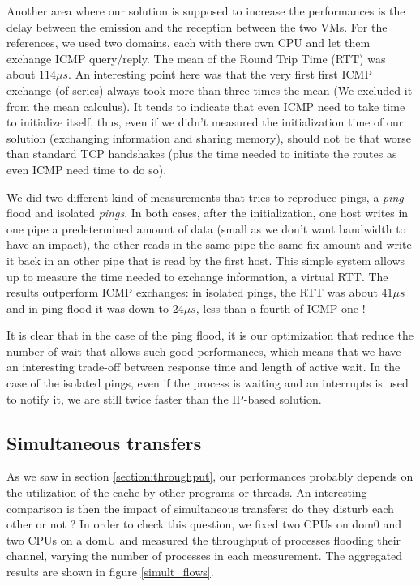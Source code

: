 \documentclass[journal]{IEEEtran}
\begin{document}
Another area where our solution is supposed to increase the performances is the delay between the emission and the reception between the two VMs. For the references, we used two domains, each with there own CPU and let them exchange ICMP query/reply. The mean of the Round Trip Time (RTT) was about $114 \mu s$. An interesting point here was that the very first first ICMP exchange (of series) always took more than three times the mean (We excluded it from the mean calculus). It tends to indicate that even ICMP need to take time to initialize itself, thus, even if we didn't measured the initialization time of our solution (exchanging information and sharing memory), should not be that worse than standard TCP handshakes (plus the time needed to initiate the routes as even ICMP need time to do so).

We did two different kind of measurements that tries to reproduce pings, a \emph{ping} flood and isolated \emph{pings}. In both cases, after the initialization, one host writes in one pipe a predetermined amount of data (small as we don't want bandwidth to have an impact), the other reads in the same pipe the same fix amount and write it back in an other pipe that is read by the first host. This simple system allows up to measure the time needed to exchange information, a virtual RTT. The results outperform ICMP exchanges: in isolated pings, the RTT was about $41 \mu s$ and in ping flood it was down to $24 \mu s$, less than a fourth of ICMP one !

It is clear that in the case of the ping flood, it is our optimization that reduce the number of wait that allows such good performances, which means that we have an interesting trade-off between response time and length of active wait. In the case of the isolated pings, even if the process is waiting and an interrupts is used to notify it, we are still twice faster than the IP-based solution.

\subsection{Simultaneous transfers}

As we saw in section \ref{section:throughput}, our performances probably depends on the utilization of the cache by other programs or threads. An interesting comparison is then the impact of simultaneous transfers: do they disturb each other or not ? In order to check this question, we fixed two CPUs on dom0 and two CPUs on a domU and measured the throughput of processes flooding their channel, varying the number of processes in each measurement. The aggregated results are shown in figure \ref{simult_flows}.
\end{document}
